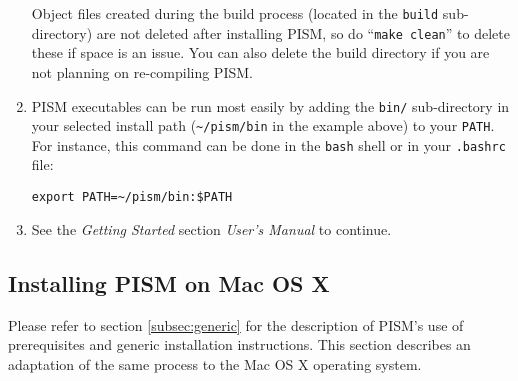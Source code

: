 \documentclass[11pt,final]{amsart}
\begin{document}
\begin{enumerate}
Object files created during the build process (located in the \texttt{build} sub-directory) are not deleted after installing PISM,
so do ``\texttt{make clean}'' to delete these if space is an issue. You can also delete the build directory if you are not
planning on re-compiling PISM.

\item PISM executables can be run most easily by adding the \texttt{bin/} sub-directory in your selected install path
  (\texttt{\textasciitilde/pism/bin} in the example above) to your \texttt{PATH}.  For instance, this command can be done in the \texttt{bash} shell or in your \texttt{.bashrc} file:
\begin{verbatim}
export PATH=~/pism/bin:$PATH
\end{verbatim}

\item See the \emph{Getting Started} section \emph{User's Manual} to continue.
\end{enumerate}

\clearpage
\subsection{Installing PISM on Mac OS X}  \label{subsec:macosx}

Please refer to section \ref{subsec:generic} for the description of PISM's use of prerequisites and generic installation
instructions. This section describes an adaptation of the same process to the Mac OS X operating system.
\end{document}
